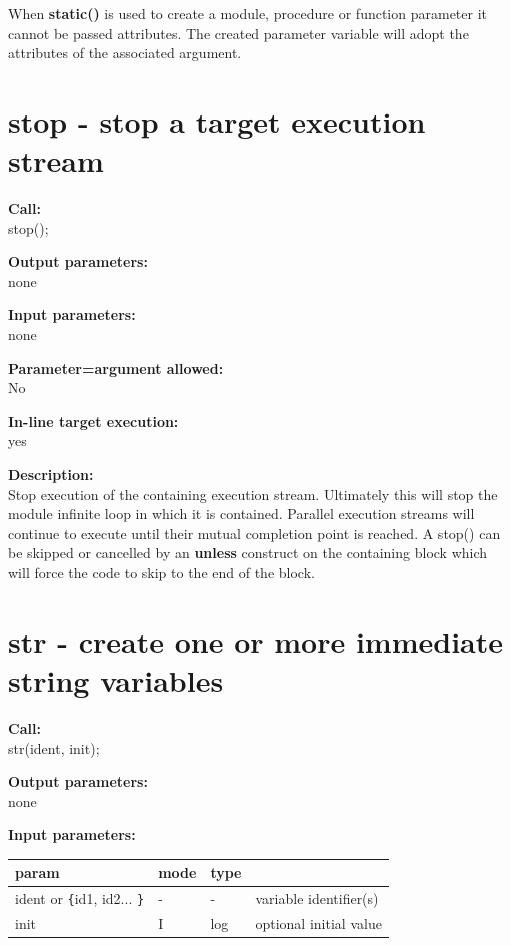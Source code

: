         When {\bf static()} is used to create a module, procedure or function
        parameter it cannot be passed attributes. The created parameter variable
        will adopt the attributes of the associated argument.

        


    \section{stop - stop a target execution stream}\label{sec:ipstop}
        
        {\bf Call:} \\
        stop();
        
        {\bf Output parameters:} \\
        none
        
        {\bf Input parameters:} \\
        none
        
        {\bf Parameter=argument allowed:} \\
        No
        
        {\bf In-line target execution:} \\
        yes
        
        {\bf Description:} \\
        Stop execution of the containing execution stream. Ultimately this
        will stop the module infinite loop in which it is contained.
        Parallel execution streams will continue to execute until their mutual
        completion point is reached. A stop() can be skipped or cancelled by
        an {\bf unless} construct on the containing block which will force the
        code to skip to the end of the block.


    \section{str - create one or more immediate string variables}\label{sec:ipstr}
        
        {\bf Call:} \\
        str(ident, init);
        
        {\bf Output parameters:} \\
        none
        
        {\bf Input parameters:} \\
        \begin{tabular}{| l | l | l | l |}
        \hline
        param  & mode & type & \\
        \hline \hline
        ident or \verb'{'id1, id2... \verb'}' & - &  -  & variable identifier(s)   \\ \hline
        init                   & I & log & optional initial value   \\ \hline
        \end{tabular}
        
